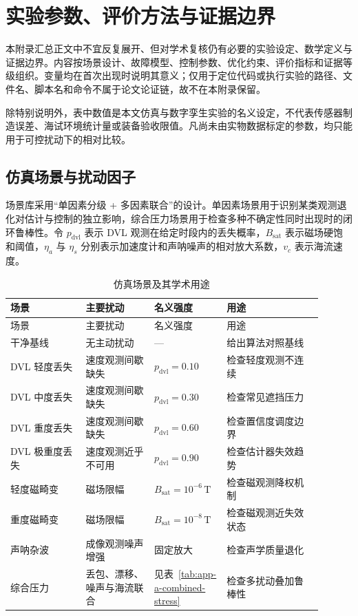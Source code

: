 
\chapter{实验参数、评价方法与证据边界}

本附录汇总正文中不宜反复展开、但对学术复核仍有必要的实验设定、数学定义与证据边界。内容按场景设计、故障模型、控制参数、优化约束、评价指标和证据等级组织。变量均在首次出现时说明其意义；仅用于定位代码或执行实验的路径、文件名、脚本名和命令不属于论文论证链，故不在本附录保留。

除特别说明外，表中数值是本文仿真与数字孪生实验的名义设定，不代表传感器制造误差、海试环境统计量或装备验收限值。凡尚未由实物数据标定的参数，均只能用于可控扰动下的相对比较。

\section{仿真场景与扰动因子}\label{sec:app-a-1}

场景库采用“单因素分级 + 多因素联合”的设计。单因素场景用于识别某类观测退化对估计与控制的独立影响，综合压力场景用于检查多种不确定性同时出现时的闭环鲁棒性。令 \(p_{\mathrm{dvl}}\) 表示 DVL 观测在给定时段内的丢失概率，\(B_{\mathrm{sat}}\) 表示磁场硬饱和阈值，\(\eta_a\) 与 \(\eta_s\) 分别表示加速度计和声呐噪声的相对放大系数，\(v_c\) 表示海流速度。

\begin{longtable}{@{}>{\raggedright\arraybackslash}p{0.22\linewidth}>{\raggedright\arraybackslash}p{0.20\linewidth}>{\raggedright\arraybackslash}p{0.20\linewidth}>{\raggedright\arraybackslash}p{0.28\linewidth}@{}}
\caption{仿真场景及其学术用途}\label{tab:app-a-scenarios}\\
\toprule
场景 & 主要扰动 & 名义强度 & 用途 \\
\midrule
\endfirsthead
\toprule
场景 & 主要扰动 & 名义强度 & 用途 \\
\midrule
\endhead
\bottomrule
\endfoot
干净基线 & 无主动扰动 & --- & 给出算法对照基线 \\
DVL 轻度丢失 & 速度观测间歇缺失 & \(p_{\mathrm{dvl}}=0.10\) & 检查轻度观测不连续 \\
DVL 中度丢失 & 速度观测间歇缺失 & \(p_{\mathrm{dvl}}=0.30\) & 检查常见遮挡压力 \\
DVL 重度丢失 & 速度观测间歇缺失 & \(p_{\mathrm{dvl}}=0.60\) & 检查置信度调度边界 \\
DVL 极重度丢失 & 速度观测近乎不可用 & \(p_{\mathrm{dvl}}=0.90\) & 检查估计器失效趋势 \\
轻度磁畸变 & 磁场限幅 & \(B_{\mathrm{sat}}=10^{-6}\,\mathrm{T}\) & 检查磁观测降权机制 \\
重度磁畸变 & 磁场限幅 & \(B_{\mathrm{sat}}=10^{-8}\,\mathrm{T}\) & 检查磁观测近失效状态 \\
声呐杂波 & 成像观测噪声增强 & 固定放大 & 检查声学质量退化 \\
综合压力 & 丢包、漂移、噪声与海流联合 & 见表~\ref{tab:app-a-combined-stress} & 检查多扰动叠加鲁棒性 \\
\end{longtable}

